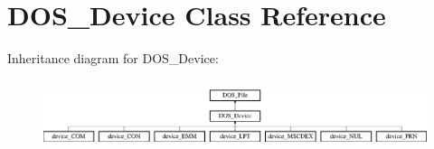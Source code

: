 \hypertarget{classDOS__Device}{\section{D\-O\-S\-\_\-\-Device Class Reference}
\label{classDOS__Device}
}
Inheritance diagram for D\-O\-S\-\_\-\-Device\-:\begin{figure}[H]
\begin{center}
\leavevmode
\includegraphics[height=2.016807cm]{classDOS__Device}
\end{center}
\end{figure}
